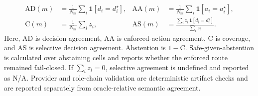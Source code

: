 \documentclass[journal]{IEEEtran}
\newif\ifshowrevisions
\newenvironment{revision}{\begingroup\ifshowrevisions\color{blue}\else\color{black}\fi}{\endgroup}
\begin{document}
\begin{revision}
{\begin{align}
\mathrm{AD}(m) &= \tfrac{1}{N_m}\textstyle\sum_i \mathbf{1}[d_i = d^{\star}_i], &
\mathrm{AA}(m) &= \tfrac{1}{N_m}\textstyle\sum_i \mathbf{1}[a_i = a^{\star}_i], \\
\mathrm{C}(m)  &= \tfrac{1}{N_m}\textstyle\sum_i z_i, &
\mathrm{AS}(m) &= \frac{\sum_i z_i\,\mathbf{1}[d_i = d^{\star}_i]}{\sum_i z_i}.
\end{align}
}
Here, AD is decision agreement, AA is enforced-action agreement, C is coverage,
and AS is selective decision agreement. Abstention is $1-\mathrm{C}$.
Safe-given-abstention is calculated over abstaining cells and reports whether
the enforced route remained fail-closed. If $\sum_i z_i = 0$, selective
agreement is undefined and reported as N/A. Provider and role-chain validation
are deterministic artifact checks and are reported separately from
oracle-relative semantic agreement.

\begin{revision}

\end{revision}
\end{revision}
\end{document}
